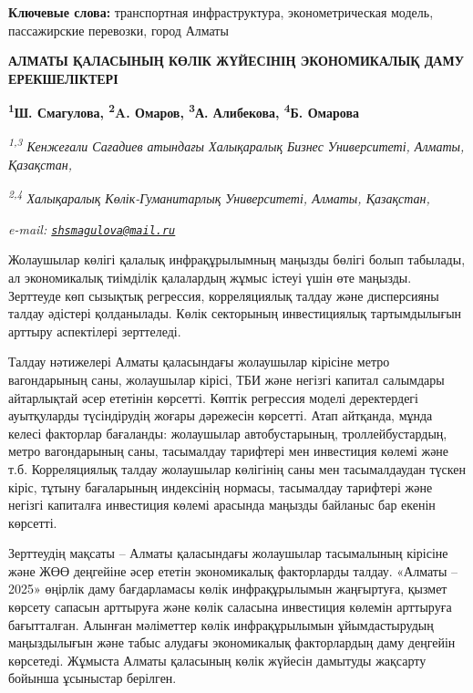 {\bfseries Ключевые слова:} транспортная инфраструктура, эконометрическая
модель, пассажирские перевозки, город Алматы

\begin{articleheader}
{\bfseries АЛМАТЫ ҚАЛАСЫНЫҢ КӨЛІК ЖҮЙЕСІНІҢ ЭКОНОМИКАЛЫҚ ДАМУ ЕРЕКШЕЛІКТЕРІ}

{\bfseries  
\textsuperscript{1}Ш. Смагулова\textsuperscript{\envelope },  
\textsuperscript{2}A. Омаров,  
\textsuperscript{3}А. Алибекова,  
\textsuperscript{4}Б. Омарова}
\end{articleheader}

\begin{affiliation}
\emph{\textsuperscript{1,3} Кенжеғали Сағадиев атындағы Халықаралық Бизнес Университеті, Алматы, Қазақстан,}

\emph{\textsuperscript{2,4} Халықаралық Көлік-Гуманитарлық Университеті, Алматы, Қазақстан,}

\emph{e-mail: \href{mailto:shsmagulova@mail.ru}{\nolinkurl{shsmagulova@mail.ru}}}
\end{affiliation}

Жолаушылар көлігі қалалық инфрақұрылымның маңызды бөлігі болып табылады,
ал экономикалық тиімділік қалалардың жұмыс істеуі үшін өте маңызды.
Зерттеуде көп сызықтық регрессия, корреляциялық талдау және дисперсияны
талдау әдістері қолданылады. Көлік секторының инвестициялық
тартымдылығын арттыру аспектілері зерттеледі.

Талдау нәтижелері Алматы қаласындағы жолаушылар кірісіне метро
вагондарының саны, жолаушылар кірісі, ТБИ және негізгі капитал салымдары
айтарлықтай әсер ететінін көрсетті. Көптік регрессия моделі деректердегі
ауытқуларды түсіндірудің жоғары дәрежесін көрсетті. Атап айтқанда, мұнда
келесі факторлар бағаланды: жолаушылар автобустарының, троллейбустардың,
метро вагондарының саны, тасымалдау тарифтері мен инвестиция көлемі және
т.б. Корреляциялық талдау жолаушылар көлігінің саны мен тасымалдаудан
түскен кіріс, тұтыну бағаларының индексінің нормасы, тасымалдау
тарифтері және негізгі капиталға инвестиция көлемі арасында маңызды
байланыс бар екенін көрсетті.

Зерттеудің мақсаты -- Алматы қаласындағы жолаушылар тасымалының кірісіне
және ЖӨӨ деңгейіне әсер ететін экономикалық факторларды талдау. «Алматы
-- 2025» өңірлік даму бағдарламасы көлік инфрақұрылымын жаңғыртуға,
қызмет көрсету сапасын арттыруға және көлік саласына инвестиция көлемін
арттыруға бағытталған. Алынған мәліметтер көлік инфрақұрылымын
ұйымдастырудың маңыздылығын және табыс алудағы экономикалық факторлардың
даму деңгейін көрсетеді. Жұмыста Алматы қаласының көлік жүйесін дамытуды
жақсарту бойынша ұсыныстар берілген.

